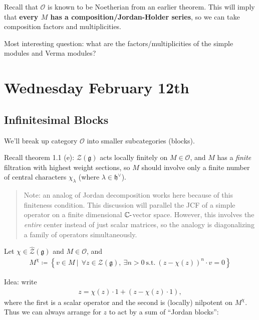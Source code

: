 \documentclass[11pt]{scrartcl}
\theoremstyle{definition}
\theoremstyle{theorem}
\theoremstyle{proof}
\theoremstyle{definition}
\theoremstyle{break}
\theoremstyle{problem}
\newcommand{\CC}[0]{{\mathbb{C}}}
\newcommand{\st}[0]{~{\text{s.t.}}~}
\newcommand{\dash}[0]{{\hbox{-}}}
\newcommand{\definedas}[0]{\coloneqq}
\newcommand{\dual}[0]{^\vee}
\newcommand{\lieg}[0]{{\mathfrak{g}}}
\newcommand{\lieh}[0]{{\mathfrak{h}}}
\newcommand{\OO}[0]{{\mathcal{O}}}
\newcommand{\mcz}[0]{{\mathcal{Z}}}
\newcommand{\suchthat}[0]{{~\mathrel{\Big|}~}}
\newcommand{\theset}[1]{\left\{{#1}\right\}}
\renewcommand{\hat}[1]{\widehat{#1}}
\begin{document}
Recall that \(\OO\) is known to be Noetherian from an earlier theorem.
This will imply that \textbf{every \(M\) has a composition/Jordan-Holder
series}, so we can take composition factors and multiplicities.

Most interesting question: what are the factors/multiplicities of the
simple modules and Verma modules?

\hypertarget{wednesday-february-12th}{%
\section{Wednesday February 12th}\label{wednesday-february-12th}}

\hypertarget{infinitesimal-blocks}{%
\subsection{Infinitesimal Blocks}\label{infinitesimal-blocks}}

We'll break up category \(\OO\) into smaller subcategories (blocks).

Recall theorem 1.1 (e): \(\mcz(\lieg)\) acts locally finitely on
\(M\in \OO\), and \(M\) has a \emph{finite} filtration with highest
weight sections, so \(M\) should involve only a finite number of central
characters \(\chi_\lambda\) (where \(\lambda \in\lieh\dual\)).

\begin{quote}
Note: an analog of Jordan decomposition works here because of this
finiteness condition. This discussion will parallel the JCF of a simple
operator on a finite dimensional \(\CC\dash\)vector space. However, this
involves the \emph{entire} center instead of just scalar matrices, so
the analogy is diagonalizing a family of operators simultaneously.
\end{quote}

Let \(\chi \in \hat \mcz(\lieg)\) and \(M\in \OO\), and
\begin{align*}
M^\chi \definedas \theset{v\in M \suchthat ~\forall z\in \mcz(\lieg),~\exists n>0 \st (z- \chi(z))^n \cdot v = 0}
\end{align*}

Idea: write
\begin{align*}
z = \chi(z) \cdot 1 + (z-\chi(z)\cdot 1),
\end{align*} where the first is a scalar operator and the second is
(locally) nilpotent on \(M^\chi\). Thus we can always arrange for \(z\)
to act by a sum of ``Jordan blocks'':
\end{document}

